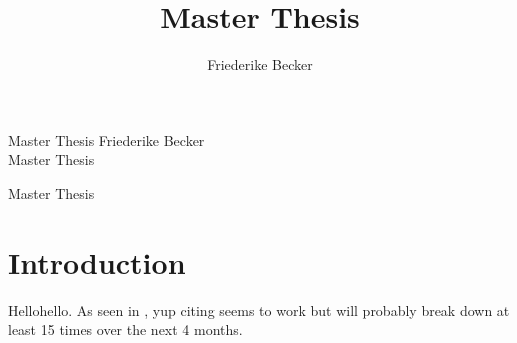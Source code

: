 \documentclass[12pt]{article}
\title{Master Thesis}
\author{Friederike Becker}
\begin{document}
\onehalfspacing

\noindent
Master Thesis  \hfill Friederike Becker \\
Master Thesis\\
\begin{center}

\Large{Master Thesis} 
\end{center}

\normalsize
\vspace{2cm}
\section{Introduction}
Hellohello. As seen in \cite{bracher_pre-registered_2021}, yup citing seems to work but will probably break down at least 15 times over the next 4 months. 
\newpage

\end{document}
